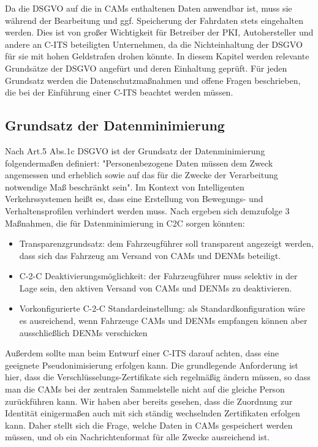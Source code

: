 Da die DSGVO auf die in CAMs enthaltenen Daten anwendbar ist, muss sie während der Bearbeitung und ggf. Speicherung der Fahrdaten stets eingehalten werden. Dies ist von großer Wichtigkeit für Betreiber der PKI, Autohersteller und andere an C-ITS beteiligten Unternehmen, da die Nichteinhaltung der DSGVO für sie mit hohen Geldstrafen drohen könnte. In diesem Kapitel werden relevante Grundsätze der DSGVO angefürt und deren Einhaltung geprüft. Für jeden Grundsatz werden die Datenschutzmaßnahmen und offene Fragen beschrieben, die bei der Einführung einer C-ITS beachtet werden müssen. 

\subsection{Grundsatz der Datenminimierung}

Nach Art.5 Abs.1c DSGVO ist der Grundsatz der Datenminimierung folgendermaßen definiert: "Personenbezogene Daten müssen dem Zweck angemessen und erheblich sowie auf das für die Zwecke der Verarbeitung notwendige Maß beschränkt sein". Im Kontext von Intelligenten Verkehrssystemen heißt es, dass eine Erstellung von Bewegungs- und Verhaltensprofilen verhindert werden muss. Nach \cite{Kiometzis2017} ergeben sich demzufolge 3 Maßnahmen, die für Datenminimierung in C2C sorgen könnten:
\begin{itemize}
	\item Transparenzgrundsatz: dem Fahrzeugführer soll transparent angezeigt werden, dass sich das Fahrzeug am Versand von CAMs und DENMs beteiligt. 
	\item C-2-C Deaktivierungsmöglichkeit: der Fahrzeugführer muss selektiv in der Lage sein, den aktiven Versand von CAMs und DENMs zu deaktivieren.
	\item Vorkonfigurierte C-2-C Standardeinstellung: als Standardkonfiguration wäre es ausreichend, wenn Fahrzeuge CAMs und DENMs empfangen können aber ausschließlich DENMs verschicken
\end{itemize}

Außerdem sollte man beim Entwurf einer C-ITS darauf achten, dass eine geeignete Pseudonimisierung erfolgen kann. Die grundlegende Anforderung ist hier, dass die Verschlüsselungs-Zertifikate sich regelmäßig ändern müssen, so dass man die CAMs bei der zentralen Sammelstelle nicht auf die gleiche Person zurückführen kann. Wir haben aber bereits gesehen, dass die Zuordnung zur Identität einigermaßen auch mit sich ständig wechselnden Zertifikaten erfolgen kann. Daher stellt sich die Frage, welche Daten in CAMs gespeichert werden müssen, und ob ein Nachrichtenformat für alle Zwecke ausreichend ist.

